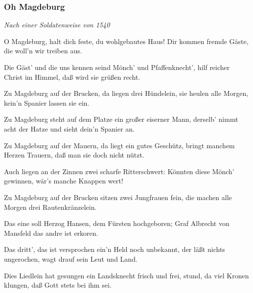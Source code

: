 \documentclass[a5paper,pagesize,twoside,10pt,headings=small]{scrartcl}
\newcommand\songheader[3][]{%
    \subsubsection*{\centering #2}\vspace{0.5\baselineskip}%
    \addcontentsline{toc}{subsection}{#2}
    \centering \textit{#3}\\%
    \vspace{\baselineskip}\par%
}
\newenvironment{myguitar}{\begin{guitar}}{\clearpage\end{guitar}}
\begin{document}
\songheader{Oh Magdeburg}{Nach einer Soldatenweise von 1540}%
\begin{multicols*}{2}
\begin{myguitar}
O Magdeburg, halt dich feste,
du wohlgebautes Haus!
Dir kommen fremde Gäste,
die woll'n wir treiben aus.

Die Gäst' und die uns kennen seind
Mönch' und Pfaffenknecht',
hilf reicher Christ im Himmel,
daß wird sie grüßen recht.

Zu Magdeburg auf der Brucken,
da liegen drei Hündelein,
sie heulen alle Morgen,
kein'n Spanier lassen sie ein.

Zu Magdeburg steht auf dem Platze
ein großer eiserner Mann,
derselb' nimmt acht der Hatze
und sieht dein'n Spanier an.

Zu Magdeburg auf der Mauern,
da liegt ein gutes Geschütz,
bringt manchem Herzen Trauern,
daß man sie doch nicht nützt.

\columnbreak

Auch liegen an der Zinnen
zwei scharfe Ritterschwert:
Könnten diese Mönch' gewinnen,
wär's manche Knappen wert!

Zu Magdeburg auf der Brucken
sitzen zwei Jungfrauen fein,
die machen alle Morgen
drei Rautenkränzelein.

Das eine soll Herzog Hansen,
dem Fürsten hochgeboren;
Graf Albrecht von Mansfeld
das andre ist erkoren.

Das dritt', das ist versprochen
ein'n Held noch unbekannt,
der läßt nichts ungerochen,
wagt drauf sein Leut und Land.

Dies Liedlein hat gesungen
ein Landsknecht frisch und frei,
stund, da viel Kronen klungen,
daß Gott stets bei ihm sei.
\end{myguitar}
\end{multicols*}
\end{document}
